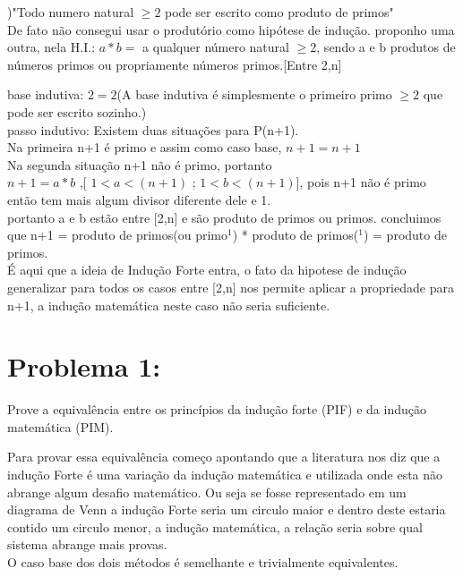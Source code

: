 \documentclass[a4paper, 10pt]{article}
\begin{document}
)"Todo numero natural $\geq2$ pode ser escrito como produto de primos"\\
De fato não consegui usar o produtório como hipótese de indução.
proponho uma outra, nela H.I.: $a*b =$ a qualquer número natural $\geq2$, sendo a e b produtos de números primos ou propriamente números primos.[Entre 2,n]\\

\raggedright
base indutiva: $2 = 2$(A base indutiva é simplesmente o primeiro primo $\geq2$ que pode ser escrito sozinho.)\checkmark\\
passo indutivo: Existem duas situações para P(n+1).\\
Na primeira n+1 é primo e assim como caso base, $n+1 = n+1$\checkmark\\
Na segunda situação n+1 não é primo, portanto\\

$n+1 = a*b$ ,[ $1<a<(n+1)$ ; $1<b<(n+1)$], pois n+1 não é primo então tem mais algum divisor diferente dele e 1.\\
portanto a e b estão entre [2,n] e são produto de primos ou primos.
concluimos que n+1 = produto de primos(ou primo$^1$) * produto de primos($^1$) = produto de primos.\\
É aqui que a ideia de Indução Forte entra, o fato da hipotese de indução generalizar para todos os casos entre [2,n] nos permite 
aplicar a propriedade para n+1, a indução matemática neste caso não seria suficiente.

\newpage

\section{Problema 1:}

Prove a equivalência entre os princípios da indução forte (PIF) e da indução matemática (PIM).\bigskip

Para provar essa equivalência começo apontando que a literatura nos diz que a indução Forte é uma variação da indução matemática e utilizada onde esta não abrange algum desafio matemático. Ou seja se fosse representado em um diagrama de Venn a indução Forte seria um circulo maior e dentro deste estaria contido um circulo menor, a indução matemática, a relação seria sobre qual sistema abrange mais provas.\\


O caso base dos dois métodos é semelhante e trivialmente equivalentes.\checkmark\\
\end{document}
